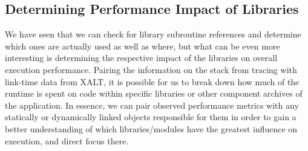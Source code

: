 \begin{table}[htbp]
\begin{center}
\begin{tabular}{|c|c|c|}
\end{tabular}
\label{tbl:scalapack-funcs}
\end{center}
\end{table}

\subsection{Determining Performance Impact of Libraries}

We have seen that we can check for library subroutine references and determine which ones are actually used as well as where, but what can be even more interesting is determining the respective impact of the libraries on overall execution performance.
Pairing the information on the stack from tracing with link-time data from XALT, it is possible for us to break down how much of the runtime is spent on code within specific libraries or other component archives of the application.
In essence, we can pair observed performance metrics with any statically or dynamically linked objects responsible for them in order to gain a better understanding of which libraries/modules have the greatest influence on execution, and direct focus there.

